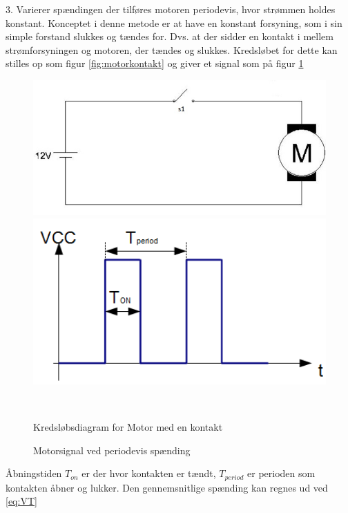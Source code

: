 3. Varierer spændingen der tilføres motoren periodevis, hvor strømmen holdes konstant.
Konceptet i denne metode er at have en konstant forsyning, som i sin simple forstand slukkes og tændes for. Dvs. at der sidder en kontakt i mellem strømforsyningen og motoren, der tændes og slukkes. Kredsløbet for dette kan stilles op som figur \ref{fig:motorkontakt} og giver et signal som på figur \ref{fig:onoffwave}

 \begin{figure}[htbp] \centering
\begin{minipage}[b]{0.48\textwidth} \centering
\includegraphics[width=1.00\textwidth]{billeder/Hardware/motorkontakt.jpg} %
\end{minipage} \hfill
\begin{minipage}[b]{0.48\textwidth} \centering
\includegraphics[width=1.00\textwidth]{billeder/Hardware/onoffwave.jpg} %
\end{minipage} \\ %
\begin{minipage}[t]{0.48\textwidth}
\caption{Kredsløbsdiagram for Motor med en kontakt} %
\label{fig:motorkontakt}
\end{minipage} \hfill
\begin{minipage}[t]{0.48\textwidth}
\caption{Motorsignal ved periodevis spænding } %
\label{fig:onoffwave}
\end{minipage}
\end{figure}
Åbningstiden $T_{on}$ er der hvor kontakten er tændt, $T_{period}$ er perioden som kontakten åbner og lukker. Den gennemsnitlige spænding kan regnes ud ved \ref{eq:VT}

